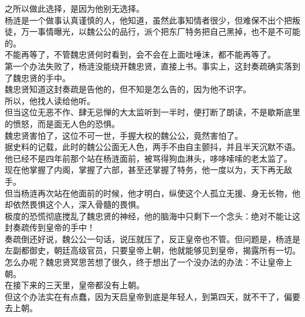 \begin{multicols}{\theparacolNo}
之所以做此选择，是因为他别无选择。\\

杨涟是一个做事认真谨慎的人，他知道，虽然此事知情者很少，但难保不出个把叛徒，万一事情曝光，以魏公公的品行，派个把东厂特务把自己黑掉，也不是不可能的。\\

不能再等了，不管魏忠贤何时看到，会不会在上面吐唾沫，都不能再等了。\\

第一个办法失败了，杨涟没能绕开魏忠贤，直接上书。事实上，这封奏疏确实落到了魏忠贤的手中。\\

魏忠贤知道这封奏疏是告他的，但不知是怎么告的，因为他不识字。\\

所以，他找人读给他听。\\

但当这位无恶不作、肆无忌惮的大太监听到一半时，便打断了朗读，不是歇斯底里的愤怒，而是面无人色的恐惧。\\

魏忠贤害怕了，这位不可一世，手握大权的魏公公，竟然害怕了。\\

据史料的记载，此时的魏公公面无人色，两手不由自主颤抖，并且半天沉默不语。\\

他已经不是四年前那个站在杨涟面前，被骂得狗血淋头，哆哆嗦嗦的老太监了。\\

现在他掌握了内阁，掌握了六部，甚至还掌握了特务，他一度以为，天下再无敌手。\\

但当杨涟再次站在他面前的时候，他才明白，纵使这个人孤立无援、身无长物，他却依然畏惧这个人，深入骨髓的畏惧。\\

极度的恐慌彻底搅乱了魏忠贤的神经，他的脑海中只剩下一个念头：绝对不能让这封奏疏传到皇帝的手中！\\

奏疏倒还好说，魏公公一句话，说压就压了，反正皇帝也不管。但问题是，杨涟是左副都御史，朝廷高级官员，只要皇帝上朝，他就能够见到皇帝，揭露所有一切。\\

怎么办呢？魏忠贤冥思苦想了很久，终于想出了一个没办法的办法：不让皇帝上朝。\\

在接下来的三天里，皇帝都没有上朝。\\

但这个办法实在有点蠢，因为天启皇帝到底是年轻人，到第四天，就不干了，偏要去上朝。\\


\end{multicols}
